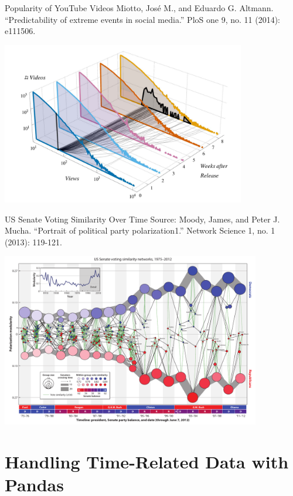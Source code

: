 \documentclass[notes, aspectratio=1610]{beamer}
\begin{document}
\begin{frame}{Popularity of YouTube Videos}
	{Miotto, José M., and Eduardo G. Altmann. ``Predictability of extreme 
	events in social media.'' PloS one 9, no. 11 (2014): e111506.}
	\centering

	\includegraphics[width=0.8\textwidth]{images/youtube_popularity.png}
\end{frame}

\begin{frame}{US Senate Voting Similarity Over Time}
	{Source: Moody, James, and Peter J. Mucha. ``Portrait of political 
	party polarization1.'' Network Science 1, no. 1 (2013): 119-121.}
	\centering

	\includegraphics[width=0.85\textwidth]{images/moody_mucha.png}
\end{frame}


\section{Handling Time-Related Data with Pandas}
\end{document}
